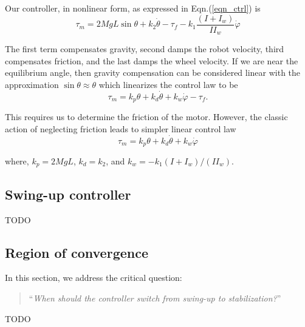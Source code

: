 \documentclass{article}
\begin{document}
Our controller, in nonlinear form, as expressed in Eqn.(\ref{eqn_ctrl}) is
\begin{equation*}
  \tau_m=2MgL\sin\theta+k_{2}\dot{\theta}-\tau_{f}-k_1\frac{(I+I_w)}{II_w}\dot{\varphi}
\end{equation*}

The first term compensates gravity, second damps the robot velocity, third compensates friction, and the last damps the wheel velocity. If we are near the equilibrium angle, then gravity compensation can be considered linear with the approximation $\sin\theta\approx\theta$ which linearizes the control law to be
\begin{equation}
  \tau_m=k_{p}\theta+k_d\dot{\theta}+k_{w}\dot{\varphi}-\tau_{f}.
\end{equation}

This requires us to determine the friction of the motor. However, the classic action of neglecting friction leads to simpler linear control law
\begin{equation}
  \tau_m=k_{p}\theta+k_d\dot{\theta}+k_{w}\dot{\varphi}
\end{equation}

where, $k_{p}=2MgL$, $k_{d}=k_{2}$, and $k_{w}=-k_{1}(I+I_w)/(II_{w})$.

\subsection{Swing-up controller}

\begin{center}
  TODO
\end{center}

\subsection{Region of convergence}

In this section, we address the critical question:
\begin{quote}
  ``\textit{When should the controller switch from swing-up to stabilization?}''
\end{quote}

\begin{center}
  TODO
\end{center}



\end{document}

